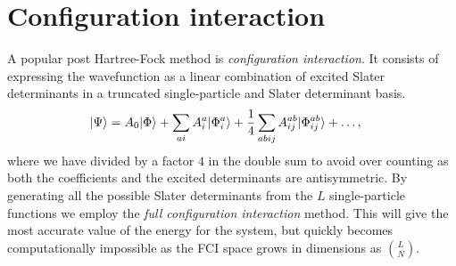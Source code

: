 \chapter{Configuration interaction}
     A popular post Hartree-Fock method is \textit{configuration interaction}.
     It consists of expressing the wavefunction as a linear combination of
     excited Slater determinants in a truncated single-particle and Slater
     determinant basis.
     \begin{align}
         | \Psi \rangle
         &= A_0| \Phi \rangle
         + \sum_{ai}A^a_i| \Phi^{a}_{i} \rangle
         + \frac{1}{4}\sum_{abij}A^{ab}_{ij}| \Phi^{ab}_{ij} \rangle
         + \dots,
     \end{align}
     where we have divided by a factor $4$ in the double sum to avoid over
     counting as both the coefficients and the excited determinants are
     antisymmetric. By generating all the possible Slater determinants from the
     $L$ single-particle functions we employ the \textit{full configuration
     interaction} method. This will give the most accurate value of the energy
     for the system, but quickly becomes computationally impossible as the FCI
     space grows in dimensions as $\binom{L}{N}$.
     \cite{kvaal2017notes}

